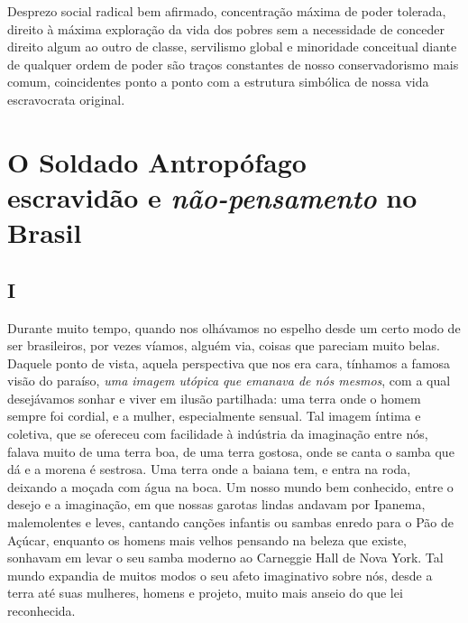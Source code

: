 Desprezo social radical bem afirmado, concentração máxima de poder
tolerada, direito à máxima exploração da vida dos pobres sem a
necessidade de conceder direito algum ao outro de classe, servilismo
global e minoridade conceitual diante de qualquer ordem de poder são
traços constantes de nosso conservadorismo mais comum, coincidentes
ponto a ponto com a estrutura simbólica de nossa vida escravocrata
original.

\chapter*{O Soldado Antropófago\\escravidão e \emph{não-pensamento} no Brasil}

\section{I}

Durante muito tempo, quando nos olhávamos no espelho desde um certo modo
de ser brasileiros, por vezes víamos, alguém via, coisas que pareciam
muito belas. Daquele ponto de vista, aquela perspectiva que nos era
cara, tínhamos a famosa visão do paraíso, \emph{uma imagem utópica}
\emph{que emanava de nós mesmos}, com a qual desejávamos sonhar e viver
em ilusão partilhada: uma terra onde o homem sempre foi cordial, e a
mulher, especialmente sensual. Tal imagem íntima e coletiva, que se
ofereceu com facilidade à indústria da imaginação entre nós, falava
muito de uma terra boa, de uma terra gostosa, onde se canta o samba que
dá e a morena é sestrosa. Uma terra onde a baiana tem, e entra na roda,
deixando a moçada com água na boca. Um nosso mundo bem conhecido, entre
o desejo e a imaginação, em que nossas garotas lindas andavam por
Ipanema, malemolentes e leves, cantando canções infantis ou sambas
enredo para o Pão de Açúcar, enquanto os homens mais velhos pensando na
beleza que existe, sonhavam em levar o seu samba moderno ao Carneggie
Hall de Nova York. Tal mundo expandia de muitos modos o seu afeto
imaginativo sobre nós, desde a terra até suas mulheres, homens e
projeto, muito mais anseio do que lei reconhecida.

